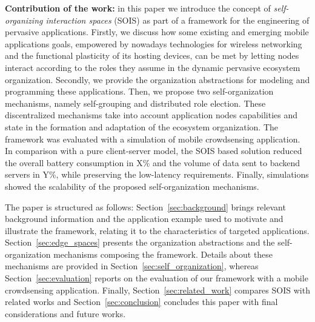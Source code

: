 \textbf{Contribution of the work:} in this paper we introduce the concept of \textit{self-organizing interaction spaces} (SOIS) as part of a framework for the engineering of pervasive applications. 
Firstly, we discuss how some existing and emerging mobile applications goals, empowered by nowadays technologies for wireless networking and the functional plasticity of its hosting devices, can be met by letting nodes interact according to the roles they assume in the dynamic pervasive ecosystem organization. Secondly, we provide the organization abstractions for modeling and programming these applications. Then, we propose two self-organization mechanisms, namely self-grouping and distributed role election. These discentralized mechanisms take into account application nodes capabilities and state in the formation and adaptation of the ecosystem organization. 
The framework was evaluated with a simulation of mobile crowdsensing application. %
In comparison with a pure client-server model, the SOIS based solution reduced the overall battery consumption in X\% and the volume of data sent to backend servers in Y\%, while preserving the low-latency requirements. Finally, simulations showed the scalability of the proposed self-organization mechanisms.

The paper is structured as follows: Section~\ref{sec:background} brings relevant background information and the application example used to motivate and illustrate the framework, relating it to the characteristics of targeted applications. Section~\ref{sec:edge_spaces} presents the organization abstractions and the self-organization mechanisms composing the framework. Details about these mechanisms are provided in Section~\ref{sec:self_organization}, whereas Section~\ref{sec:evaluation} reports on the evaluation of our framework with a mobile crowdsensing application. Finally, Section~\ref{sec:related_work} compares SOIS with related works and Section~\ref{sec:conclusion} concludes this paper with final considerations and future works.
